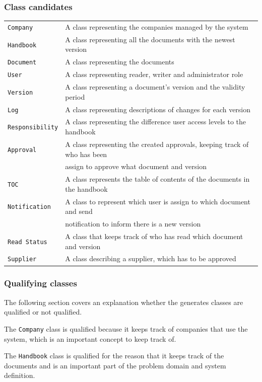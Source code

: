 \subsubsection{Class candidates} 
\begin{tabular}{l l}
	\texttt{Company} & A class representing the companies managed by the system \\
	\texttt{Handbook} & A class representing all the documents with the newest version\\
	\texttt{Document} & A class representing the documents\\
	\texttt{User }& A class representing reader, writer and administrator role\\
	\texttt{Version} & A class representing a document’s version and the validity period\\
	\texttt{Log} & A class representing descriptions of changes for each version\\ 
	\texttt{Responsibility} & A class representing the difference user access levels to the handbook\\ 
	\texttt{Approval} & A class representing the created approvals, keeping track of who has been\\&assign to approve what document and version\\ 
	\texttt{TOC} & A class represents the table of contents of the documents in the handbook\\
	\texttt{Notification} & A class to represent which user is assign to which document and send\\&notification to inform there is a new version\\ 
	\texttt{Read Status} & A class that keeps track of who has read which document and version\\
	\texttt{Supplier} & A class describing a supplier, which has to be approved 
\end{tabular}

\subsubsection{Qualifying classes}
The following section covers an explanation whether the generates classes are qualified or not qualified.

The \texttt{Company} class is qualified because it keeps track of companies that use the system, which is an important concept to keep track of.

The \texttt{Handbook} class is qualified for the reason that it keeps track of the documents and is an important part of the problem domain and system definition.

